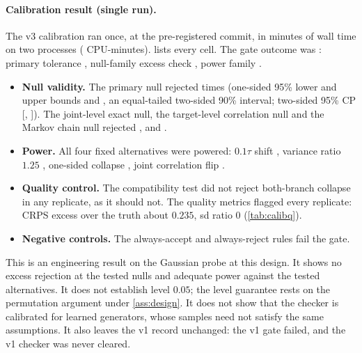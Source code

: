\documentclass{article}
\theoremstyle{plain}
\theoremstyle{definition}
\theoremstyle{remark}
\begin{document}
\paragraph{Calibration result (single run).}
The v3 calibration ran once, at the pre-registered commit, in \numCalibWall{} minutes of wall time on two processes (\numCalibCPU{} CPU-minutes).  lists every cell.
The gate outcome was \textbf{\numCalibGate}: primary tolerance \numCalibGOne, null-family excess check \numCalibGTwo, power family \numCalibGThree.
\begin{itemize}
\item \textbf{Null validity.} The primary null rejected \numCalibPrimK{} times (one-sided 95\% lower and upper bounds \numCalibPrimLo{} and \numCalibPrimHi, an equal-tailed two-sided 90\% interval; two-sided 95\% CP [\numCalibPrimTwoLo, \numCalibPrimTwoHi]). The joint-level exact null, the target-level correlation null and the Markov chain null rejected \numCalibNullJ, \numCalibNullCorrT{} and \numCalibNullChain.
\item \textbf{Power.} All four fixed alternatives were powered: $0.1\tau$ shift \numCalibPowShift, variance ratio $1.25$ \numCalibPowVar, one-sided collapse \numCalibPowCollInt, joint correlation flip \numCalibPowCorrJ.
\item \textbf{Quality control.} The compatibility test did not reject both-branch collapse in any replicate, as it should not. The quality metrics flagged every replicate: CRPS excess over the truth about $0.235$, sd ratio $0$ (\cref{tab:calibq}).
\item \textbf{Negative controls.} The always-accept and always-reject rules fail the gate.
\end{itemize}

This is an engineering result on the Gaussian probe at this design.
It shows no excess rejection at the tested nulls and adequate power against the tested alternatives.
It does not establish level $0.05$; the level guarantee rests on the permutation argument under \cref{ass:design}.
It does not show that the checker is calibrated for learned generators, whose samples need not satisfy the same assumptions.
It also leaves the v1 record unchanged: the v1 gate failed, and the v1 checker was never cleared.
\end{document}

